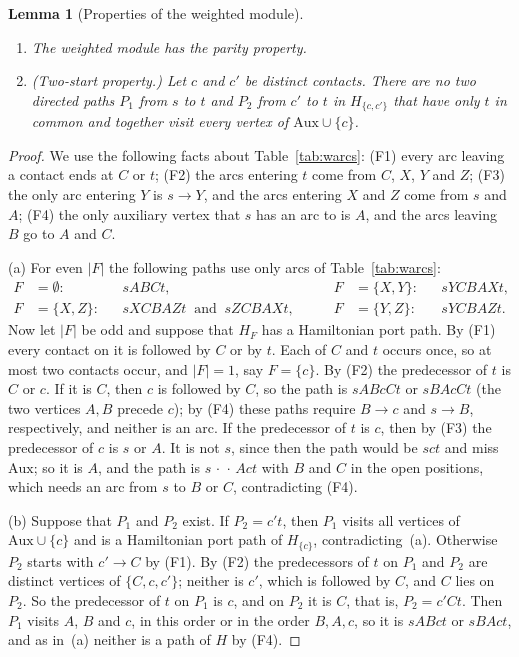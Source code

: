 \documentclass[11pt]{amsart}
\newtheorem{lemma}[theorem]{Lemma}
\theoremstyle{definition}
\theoremstyle{remark}
\numberwithin{equation}{section}
\newcommand{\Aux}{\mathrm{Aux}}
\begin{document}
\begin{lemma}[Properties of the weighted module]\label{lem:wparity}
\leavevmode
\begin{enumerate}[label=\textup{(\alph*)},leftmargin=2.2em]
\item The weighted module has the parity property.
\item \textup{(Two-start property.)} Let $c$ and $c'$ be distinct contacts. There are no two directed paths $P_1$ from $s$ to $t$ and $P_2$ from $c'$ to $t$ in $H_{\{c,c'\}}$ that have only $t$ in common and together visit every vertex of $\Aux\cup\{c\}$.
\end{enumerate}
\end{lemma}

\begin{proof}
We use the following facts about Table~\ref{tab:warcs}: (F1) every arc leaving a contact ends at $C$ or $t$; (F2) the arcs entering $t$ come from $C$, $X$, $Y$ and $Z$; (F3) the only arc entering $Y$ is $s\to Y$, and the arcs entering $X$ and $Z$ come from $s$ and $A$; (F4) the only auxiliary vertex that $s$ has an arc to is $A$, and the arcs leaving $B$ go to $A$ and $C$.

(a) For even $|F|$ the following paths use only arcs of Table~\ref{tab:warcs}:
\[
\begin{aligned}
F&=\emptyset: && sABCt, &\qquad F&=\{X,Y\}: && sYCBAXt,\\
F&=\{X,Z\}: && sXCBAZt\ \text{ and }\ sZCBAXt, &\qquad F&=\{Y,Z\}: && sYCBAZt.
\end{aligned}
\]
Now let $|F|$ be odd and suppose that $H_F$ has a Hamiltonian port path. By (F1) every contact on it is followed by $C$ or by $t$. Each of $C$ and $t$ occurs once, so at most two contacts occur, and $|F|=1$, say $F=\{c\}$. By (F2) the predecessor of $t$ is $C$ or $c$. If it is $C$, then $c$ is followed by $C$, so the path is $sABcCt$ or $sBAcCt$ (the two vertices $A,B$ precede $c$); by (F4) these paths require $B\to c$ and $s\to B$, respectively, and neither is an arc. If the predecessor of $t$ is $c$, then by (F3) the predecessor of $c$ is $s$ or $A$. It is not $s$, since then the path would be $sct$ and miss $\Aux$; so it is $A$, and the path is $s\,\cdot\,\cdot\,Act$ with $B$ and $C$ in the open positions, which needs an arc from $s$ to $B$ or $C$, contradicting (F4).

(b) Suppose that $P_1$ and $P_2$ exist. If $P_2=c't$, then $P_1$ visits all vertices of $\Aux\cup\{c\}$ and is a Hamiltonian port path of $H_{\{c\}}$, contradicting~(a). Otherwise $P_2$ starts with $c'\to C$ by (F1). By (F2) the predecessors of $t$ on $P_1$ and $P_2$ are distinct vertices of $\{C,c,c'\}$; neither is $c'$, which is followed by $C$, and $C$ lies on $P_2$. So the predecessor of $t$ on $P_1$ is $c$, and on $P_2$ it is $C$, that is, $P_2=c'Ct$. Then $P_1$ visits $A$, $B$ and $c$, in this order or in the order $B,A,c$, so it is $sABct$ or $sBAct$, and as in~(a) neither is a path of $H$ by (F4).
\end{proof}
\end{document}
